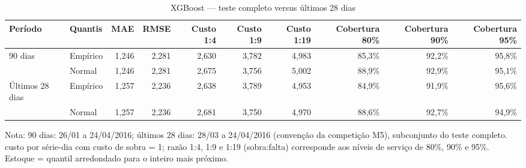 \begin{table}[htbp]
\centering
\small
\caption{XGBoost — teste completo versus últimos 28 dias}
\label{tab:xgb_verificacao_28d}
\begin{tabular}{llrrrrrrrr}
\toprule
Período & Quantis & MAE & RMSE & Custo 1:4 & Custo 1:9 & Custo 1:19 & Cobertura 80\% & Cobertura 90\% & Cobertura 95\% \\
\midrule
90 dias & Empírico & 1,246 & 2,281 & 2,630 & 3,782 & 4,983 & 85,3\% & 92,2\% & 95,8\% \\
 & Normal & 1,246 & 2,281 & 2,675 & 3,756 & 5,002 & 88,9\% & 92,9\% & 95,1\% \\
\addlinespace
Últimos 28 dias & Empírico & 1,257 & 2,236 & 2,638 & 3,789 & 4,953 & 84,9\% & 91,9\% & 95,6\% \\
 & Normal & 1,257 & 2,236 & 2,681 & 3,750 & 4,970 & 88,6\% & 92,7\% & 94,9\% \\
\bottomrule
\end{tabular}
\par\smallskip
{\footnotesize Nota: 90 dias: 26/01 a 24/04/2016; últimos 28 dias: 28/03 a 24/04/2016 (convenção da competição M5), subconjunto do teste completo. custo por série-dia com custo de sobra = 1; razão 1:4, 1:9 e 1:19 (sobra:falta) corresponde aos níveis de serviço de 80\%, 90\% e 95\%. Estoque = quantil arredondado para o inteiro mais próximo.}
\end{table}
